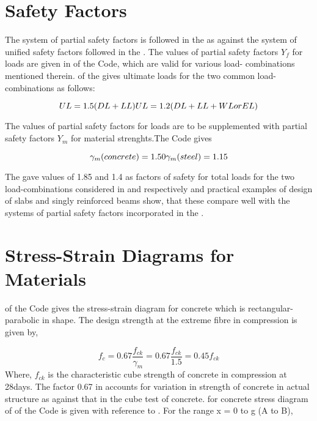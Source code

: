 \section{Safety Factors}

The system of partial safety factors is followed in the
 as against the system of uniﬁed safety factors
followed in the . The values of partial safety factors ${Y_f}$ for loads are given in  of the Code, which are valid for various load- combinations mentioned therein.  of the  gives ultimate loads for the two common load-combinations as
follows:

\begin{equation}
UL = 1.5 (DL + LL)\\
UL = 1.2 (DL + LL + WL or EL)
\end{equation}

The values of partial safety factors for loads are to be supplemented
with partial safety factors $Y_m$ for material strenghts.The Code gives           

\begin{equation}
\gamma_m (concrete) = 1.50\\
\gamma_m (steel) = 1.15 
\end{equation}

The  gave values of 1.85 and 1.4 as factors of
safety for total loads for the two load-combinations considered in
 and  respectively and practical examples of design of
slabs and singly reinforced beams show, that these compare well with the
systems of partial safety factors incorporated in the
.

\section{Stress-Strain Diagrams for Materials}

 of the Code gives the stress-strain diagram for concrete which
is rectangular-parabolic in shape. The design strength at the extreme fibre in compression is given by,

\begin{equation}
f_c = 0.67\frac{f_{ck}}{\gamma_m} = 0.67\frac{f_{ck}}{1.5}=0.45 f_{ck}
\end{equation}
Where, $f_{ck}$ is the characteristic cube strength of concrete in
compression at 28days. The factor 0.67 in  accounts for
variation in strength of concrete in actual structure as against
that in the cube test of concrete. \eqn for concrete stress diagram
of  of the Code is given with reference to . For the
range x = 0 to g (A to B),

